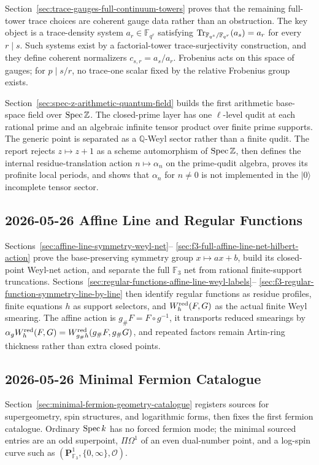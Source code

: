 Section~\ref{sec:trace-gauges-full-continuum-towers} proves that the remaining
full-tower trace choices are coherent gauge data rather than an obstruction.
The key object is a trace-density system \(a_r\in\mathbb F_{q^r}\) satisfying
\(\operatorname{Tr}_{\mathbb F_{q^s}/\mathbb F_{q^r}}(a_s)=a_r\) for every \(r\mid s\).
Such systems exist by a factorial-tower trace-surjectivity construction, and
they define coherent normalizers \(c_{s,r}=a_s/a_r\).  Frobenius acts on this
space of gauges; for \(p\mid s/r\), no trace-one scalar fixed by the relative
Frobenius group exists.

Section~\ref{sec:spec-z-arithmetic-quantum-field} builds the first arithmetic
base-space field over \(\operatorname{Spec}\mathbb Z\).  The closed-prime layer has one
\(\ell\)-level qudit at each rational prime and an algebraic infinite tensor
product over finite prime supports.  The generic point is separated as a
\(\mathbb Q\)-Weyl sector rather than a finite qudit.  The report rejects
\(z\mapsto z+1\) as a scheme automorphism of \(\operatorname{Spec}\mathbb Z\), then defines
the internal residue-translation action \(n\mapsto\alpha_n\) on the prime-qudit
algebra, proves its profinite local periods, and shows that \(\alpha_n\) for
\(n\ne0\) is not implemented in the \(|0\rangle\) incomplete tensor sector.

\subsection*{2026-05-26 Affine Line and Regular Functions}

Sections~\ref{sec:affine-line-symmetry-weyl-net}--%
\ref{sec:f3-full-affine-line-net-hilbert-action} prove the base-preserving
symmetry group \(x\mapsto ax+b\), build its closed-point Weyl-net action, and
separate the full \(\mathbb F_3\) net from rational finite-support
truncations.  Sections~\ref{sec:regular-functions-affine-line-weyl-labels}--%
\ref{sec:f3-regular-function-symmetry-line-by-line} then identify regular
functions as residue profiles, finite equations \(h\) as support selectors,
and \(W_h^{\rm red}(F,G)\) as the actual finite Weyl smearing.  The affine
action is \(g_\#F=F\circ g^{-1}\), it transports reduced smearings by
\(\alpha_gW_h^{\rm red}(F,G)=W_{g_\#h}^{\rm red}(g_\#F,g_\#G)\), and repeated
factors remain Artin-ring thickness rather than extra closed points.

\subsection*{2026-05-26 Minimal Fermion Catalogue}

Section~\ref{sec:minimal-fermion-geometry-catalogue} registers sources for
supergeometry, spin structures, and logarithmic forms, then fixes the first
fermion catalogue.  Ordinary \(\operatorname{Spec} k\) has no forced fermion mode; the
minimal sourced entries are an odd superpoint, \(\Pi\Omega^1\) of an even
dual-number point, and a log-spin curve such as
\((\mathbf P^1_{\mathbb F_3},\{0,\infty\},\mathcal O)\).
